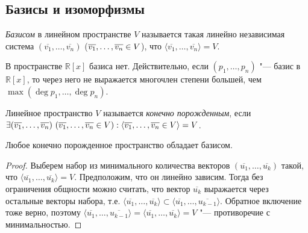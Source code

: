 \subsection{Базисы и изоморфизмы}

\begin{definition}
	\textit{Базисом} в линейном пространстве $V$ называется такая линейно независимая система $(\overline{v_1}, \dots, \overline{v_n})$ ($\overline{v_1}, \dots, \overline{v_n} \hm{\in} V$), что $\langle\overline{v_1}, \dots, \overline{v_n}\rangle = V$.
\end{definition}

\begin{note}
	В пространстве $\mathbb{R}[x]$ базиса нет. Действительно, если $(p_1, \dots, p_n)$ "--- базис в $\mathbb{R}[x]$, то через него не выражается многочлен степени большей, чем $\max(\deg{p_1}, \dots, \deg{p_n})$.
\end{note}

\begin{definition}
	Линейное пространство $V$ называется \textit{конечно порожденным}, если $\exists(\overline{v_1}, \dots, \overline{v_n})~(\overline{v_1}, \dots, \overline{v_n} \hm{\in} V): \langle\overline{v_1}, \dots, \overline{v_n} \hm{\in} V\rangle \hm{=} V$.
\end{definition}

\begin{proposition}
	Любое конечно порожденное пространство обладает базисом.
\end{proposition}

\begin{proof}
	Выберем набор из минимального количества векторов $(\overline{u_1}, \dots, \overline{u_k})$ такой, что $\langle\overline{u_1}, \dots, \overline{u_k}\rangle = V$. Предположим, что он линейно зависим. Тогда без ограничения общности можно считать, что вектор $\overline{u_k}$ выражается через остальные векторы набора, т.\:е. $\langle\overline{u_1}, \dots, \overline{u_k}\rangle \subset \langle\overline{u_1}, \dots, \overline{u_{k-1}}\rangle$. Обратное включение тоже верно, поэтому $\langle\overline{u_1}, \dots, \overline{u_{k - 1}}\rangle = \langle\overline{u_1}, \dots, \overline{u_k}\rangle = V$ "--- противоречие с минимальностью.
\end{proof}

